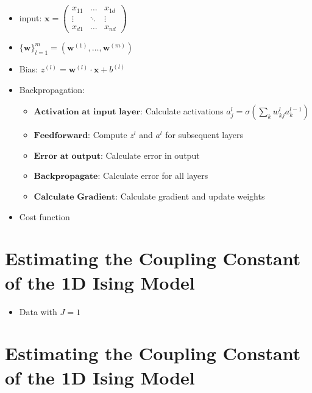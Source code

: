 \documentclass[11pt]{article}
\begin{document}
\begin{itemize}
    \item input: $\boldsymbol{x} = 
        \begin{pmatrix}
            x_{11} & \dots & x_{1d} \\
            \vdots & \ddots & \vdots \\
            x_{d1} & \dots & x_{nd}
        \end{pmatrix}$
    \item $\{\boldsymbol{w}\}^m_{l=1} = \left(\boldsymbol{w}^{(1)},\dots,\boldsymbol{w}^{(m)}\right)$
    \item Bias: $z^{(l)} = \boldsymbol{w}^{(l)}\cdot \boldsymbol{x} + b^{(l)}$
    \item Backpropagation:
        \begin{itemize}
            \item \(\textbf{Activation at input layer}\): Calculate activations $a^l_j = \sigma\left(\sum_k w^l_{kj}a^{l-1}_k\right)$
            \item \(\textbf{Feedforward}\): Compute $z^l$ and $a^l$ for subsequent layers
            \item \(\textbf{Error at output}\): Calculate error in output
            \item \(\textbf{Backpropagate}\): Calculate error for all layers 
            \item \(\textbf{Calculate Gradient}\): Calculate gradient and update weights
        \end{itemize}
    \item Cost function
\end{itemize}

\newpage
\hypertarget{estimating-the-coupling-constant-of-the-1d-ising-model}{%
\section*{Estimating the Coupling Constant of the 1D Ising
Model}\label{estimating-the-coupling-constant-of-the-1d-ising-model}}

\begin{itemize}
    \item Data with $J=1$
\end{itemize}

\newpage
\hypertarget{estimating-the-coupling-constant-of-the-1d-ising-model}{%
\section*{Estimating the Coupling Constant of the 1D Ising
Model}\label{estimating-the-coupling-constant-of-the-1d-ising-model2}}
\end{document}
